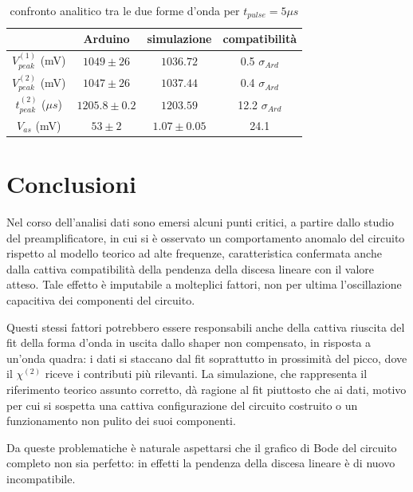 \documentclass{article}
\begin{document}
\begin{table}[H]
    \centering
    \begin{tabular}{cccc}
        \toprule
                        & Arduino & simulazione & compatibilità \\
        \midrule
        $V_{peak}^{(1)}$ (mV)&   $1049 \pm 26$ & $1036.72$ & 0.5 $\sigma_{Ard}$\\
        $V_{peak}^{(2)}$ (mV)&   $1047 \pm 26$ & $1037.44$ & 0.4 $\sigma_{Ard}$\\
        $t_{peak}^{(2)}$ ($\mu s$)&   $1205.8 \pm 0.2$ & $1203.59$ & 12.2 $\sigma_{Ard}$\\
        $V_{as}$       (mV)&   $53 \pm 2$ & $1.07 \pm 0.05$ & 24.1 \\
        \bottomrule
    \end{tabular}
    \caption{confronto analitico tra le due forme d'onda per $t_{pulse}=5 \mu s$}
\end{table}




\section{Conclusioni}

Nel corso dell'analisi dati sono emersi alcuni punti critici, a partire dallo studio del preamplificatore, in cui si è osservato un comportamento anomalo del circuito
rispetto al modello teorico ad alte frequenze, caratteristica confermata anche dalla cattiva compatibilità della pendenza della discesa lineare con il valore atteso.
Tale effetto è imputabile a molteplici fattori, non per ultima l'oscillazione capacitiva dei componenti del circuito.

Questi stessi fattori potrebbero essere responsabili anche della cattiva riuscita del fit della forma d'onda in uscita dallo shaper non compensato, in risposta a
un'onda quadra: i dati si staccano dal fit soprattutto in prossimità del picco, dove il $\chi^{(2)}$ riceve i contributi più rilevanti. La simulazione, che rappresenta
il riferimento teorico assunto corretto, dà ragione al fit piuttosto che ai dati, motivo per cui si sospetta una cattiva configurazione del circuito costruito o un
funzionamento non pulito dei suoi componenti.

Da queste problematiche è naturale aspettarsi che il grafico di Bode del circuito completo non sia perfetto: in effetti la pendenza della discesa lineare è di nuovo
incompatibile.
\end{document}
